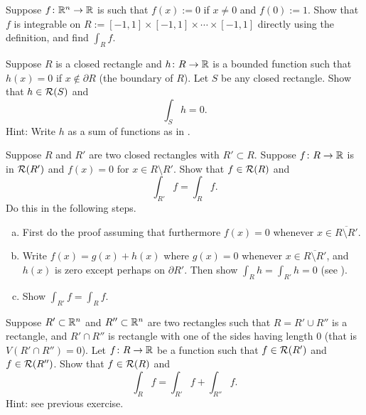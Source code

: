 \begin{exercise}
Suppose $f\colon {\mathbb{R}}^n \to {\mathbb{R}}$ is such that
$f(x) := 0$ if $x\not= 0$ and $f(0) := 1$.  Show that $f$ is integrable
on $R := [-1,1] \times [-1,1] \times \cdots \times [-1,1]$ directly using the
definition, and find $\int_R f$.
\end{exercise}

\begin{exercise} \label{mv:zeroinside}
Suppose $R$ is a closed rectangle and $h \colon R \to {\mathbb{R}}$ is a bounded function
such that $h(x) = 0$ if $x \notin \partial R$ (the boundary of $R$).
Let $S$ be any closed rectangle.
Show that $h \in {\mathcal{R}}(S)$ and
\begin{equation*}
\int_{S} h = 0 .
\end{equation*}
Hint: Write $h$ as a sum of functions as in .
\end{exercise}

\begin{exercise} \label{mv:zerooutside}
Suppose $R$ and $R'$ are two closed rectangles with $R' \subset R$.  Suppose $f \colon R \to {\mathbb{R}}$ is in ${\mathcal{R}}(R')$
and $f(x) = 0$ for $x \in R \setminus R'$.
Show that $f \in {\mathcal{R}}(R)$ and
\begin{equation*}
\int_{R'} f = \int_R f .
\end{equation*}
Do this in the following steps.
\begin{enumerate}[a)]
\item
First do the proof assuming that furthermore $f(x) = 0$ whenever $x
\in \overline{R \setminus R'}$.
\item
Write $f(x) = g(x) + h(x)$ where $g(x) = 0$ whenever $x
\in \overline{R \setminus R'}$, and $h(x)$ is zero except perhaps on
$\partial R'$.
Then show $\int_R h = \int_{R'} h = 0$ (see ).
\item
Show 
$\int_{R'} f = \int_R f$.
\end{enumerate}
\end{exercise}

\begin{exercise}
Suppose $R' \subset {\mathbb{R}}^n$ and $R'' \subset {\mathbb{R}}^n$ are two rectangles
such that $R = R' \cup R''$ is a rectangle, and $R' \cap R''$ is rectangle
with one of the sides having length 0 (that is $V(R' \cap R'') = 0$).
Let $f \colon R \to {\mathbb{R}}$ be a function such that $f \in {\mathcal{R}}(R')$ and
$f \in {\mathcal{R}}(R'')$.  Show that $f \in {\mathcal{R}}(R)$ and
\begin{equation*}
\int_{R} f = \int_{R'} f + \int_{R''} f .
\end{equation*}
Hint: see previous exercise.
\end{exercise}

